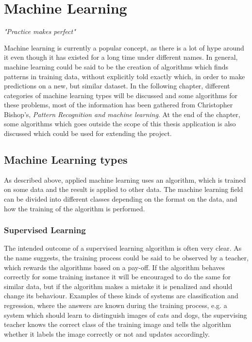 \chapter{Machine Learning}
\begin{center}
\vspace{-6ex}
\textit{"Practice makes perfect"}
\vspace{6ex}
\end{center}
\label{chap:machine}

Machine learning is currently a popular concept, as there is a lot of hype around it even though it has existed for a long time under different names. In general, machine learning could be said to be the creation of algorithms which finds patterns in training data, without explicitly told exactly which, in order to make predictions on a new, but similar dataset. In the following chapter, different categories of machine learning types will be discussed and some algorithms for these problems, most of the information has been gathered from Christopher Bishop's, \textit{Pattern Recognition and machine learning}\cite{bishop_pattern}. At the end of the chapter, some algorithms which goes outside the scope of this thesis application is also discussed which could be used for extending the project.

\section{Machine Learning types}

As described above, applied machine learning uses an algorithm, which is trained on some data and the result is applied to other data. The machine learning field can be divided into different classes depending on the format on the data, and how the training of the algorithm is performed.

\subsection{Supervised Learning}

The intended outcome of a supervised learning algorithm is often very clear. As the name suggests, the training process could be said to be observed by a teacher, which rewards the algorithms based on a pay-off. If the algorithm behaves correctly for some training instance it will be encouraged to do the same for similar data, but if the algorithm makes a mistake it is penalized and should change its behaviour. Examples of these kinds of systems are classification and regression, where the answers are known during the training process, e.g. a system which should learn to distinguish images of cats and dogs, the supervising teacher knows the correct class of the training image and tells the algorithm whether it labels the image correctly or not and updates accordingly.

